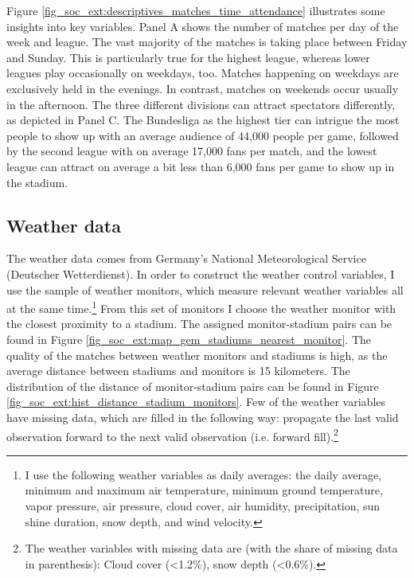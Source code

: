 \documentclass[11pt, a4paper]{article} %
\begin{document}

Figure \ref{fig_soc_ext:descriptives_matches_time_attendance} illustrates some insights into key variables. Panel A shows the number of matches per day of the week and league. The vast majority of the matches is taking place between Friday and Sunday. This is particularly true for the highest league, whereas lower leagues play occasionally on weekdays, too. Matches happening on weekdays are exclusively held in the evenings. In contrast, matches on weekends occur usually in the afternoon. The three different divisions can attract spectators differently, as depicted in Panel C. The Bundesliga as the highest tier can intrigue the most people to show up with an average audience of 44,000 people per game, followed by the second league with on average 17,000 fans per match, and the lowest league can attract on average a bit less than 6,000 fans per game to show up in the stadium.



\subsection{Weather data}
The weather data comes from Germany's National Meteorological Service (Deutscher Wetterdienst). In order to construct the weather control variables, I use the sample of weather monitors, which measure relevant weather variables all at the same time.\footnote{I use the following weather variables as daily averages: the daily average, minimum and maximum air temperature,  minimum ground temperature, vapor pressure, air pressure, cloud cover, air humidity, precipitation, sun shine duration, snow depth, and wind velocity.} From this set of monitors I choose the weather monitor with the closest proximity to a stadium. The assigned monitor-stadium pairs can be found in Figure \ref{fig_soc_ext:map_gem_stadiums_nearest_monitor}. The quality of the matches between weather monitors and stadiums is high, as the average distance between stadiums and monitors is 15 kilometers. The distribution of the distance of monitor-stadium pairs can be found in Figure \ref{fig_soc_ext:hist_distance_stadium_monitors}. Few of the  weather variables have missing data, which are filled in the following way: propagate the last valid observation forward to the next valid observation (i.e. forward fill).\footnote{The weather variables with missing data are (with the share of missing data in parenthesis): Cloud cover (<1.2\%), snow depth (<0.6\%).}
\end{document}

